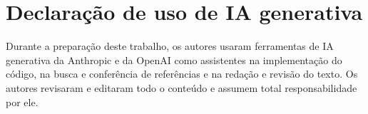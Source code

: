 
\section{Declaração de uso de IA generativa}\label{sec:declaração}

Durante a preparação deste trabalho, os autores usaram ferramentas de IA generativa da Anthropic e da OpenAI
como assistentes na implementação do código, na busca e conferência de referências e na redação e revisão do
texto. Os autores revisaram e editaram todo o conteúdo e assumem total responsabilidade por ele.
